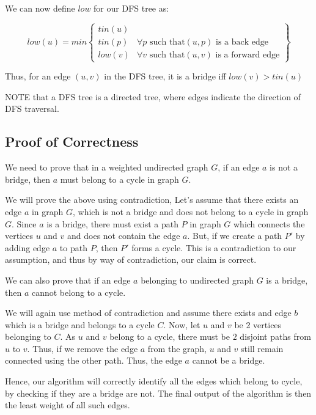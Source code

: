 \documentclass{article}
\begin{document}
We can now define $low$ for our DFS tree as:

\begin{equation}
low(u) = min
\left\{
    \begin{array}{lr}
        tin(u)\\
        tin(p) & \forall p \text{ such that} (u, p) \text{ is a back edge}\\
        low(v) & \forall v \text{ such that} (u, v) \text{ is a forward edge}
    \end{array}
\right\}
\end{equation}

Thus, for an edge $(u, v)$ in the DFS tree, it is a bridge iff $low(v) > tin(u)$ 

NOTE that a DFS tree is a directed tree, where edges indicate the direction of DFS traversal.

\subsection{Proof of Correctness}

We need to prove that in a weighted undirected graph $G$, if an edge $a$ is not a bridge, then $a$ must belong to a cycle in graph $G$.

We will prove the above using contradiction, Let's assume that there exists an edge $a$ in graph $G$, which is not a bridge and does not belong to a cycle in graph $G$. Since $a$ is a bridge, there must exist a path $P$ in graph $G$ which connects the vertices $u$ and $v$ and does not contain the edge $a$. But, if we create a path $P'$ by adding edge $a$ to path $P$, then $P'$ forms a cycle. This is a contradiction to our assumption, and thus by way of contradiction, our claim is correct.

We can also prove that if an edge $a$ belonging to undirected graph $G$ is a bridge, then $a$ cannot belong to a cycle. 

We will again use method of contradiction and assume there exists and edge $b$ which is a bridge and belongs to a cycle $C$. Now, let $u$ and $v$ be 2 vertices belonging to $C$. As $u$ and $v$ belong to a cycle, there must be $2$ disjoint paths from $u$ to $v$. Thus, if we remove the edge $a$ from the graph, $u$ and $v$ still remain connected using the other path. Thus, the edge $a$ cannot be a bridge. 

Hence, our algorithm will correctly identify all the edges which belong to cycle, by checking if they are a bridge are not. The final output of the algorithm is then the least weight of all such edges.
\end{document}
